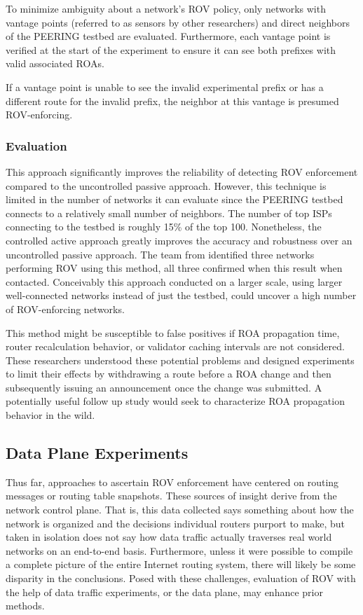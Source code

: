 \documentclass[sigconf]{acmart}
\begin{document}
To minimize ambiguity about a network's ROV policy, only networks with
vantage points (referred to as sensors by other researchers) and direct
neighbors of the PEERING testbed are evaluated.  Furthermore, each
vantage point is verified at the start of the experiment to ensure it
can see both prefixes with valid associated ROAs.

If a vantage point is unable to see the invalid experimental prefix or
has a different route for the invalid prefix, the neighbor at this
vantage is presumed ROV-enforcing.

\subsubsection{Evaluation}

This approach significantly improves the reliability of detecting ROV
enforcement compared to the uncontrolled passive approach.  However,
this technique is limited in the number of networks it can evaluate
since the PEERING testbed connects to a relatively small number of
neighbors. The number of top ISPs connecting to the testbed is roughly
15\% of the top 100.  Nonetheless, the controlled active approach
greatly improves the accuracy and robustness over an uncontrolled
passive approach.  The team from \cite{reuter_towards_2018} identified
three networks performing ROV using this method, all three confirmed
when this result when contacted.  Conceivably this approach conducted on
a larger scale, using larger well-connected networks instead of just the
testbed, could uncover a high number of ROV-enforcing networks.

This method might be susceptible to false positives if ROA propagation
time, router recalculation behavior, or validator caching intervals are
not considered.  These researchers understood these potential problems
and designed experiments to limit their effects by withdrawing a route
before a ROA change and then subsequently issuing an announcement once
the change was submitted.  A potentially useful follow up study would
seek to characterize ROA propagation behavior in the wild.

\subsection{Data Plane Experiments}

Thus far, approaches to ascertain ROV enforcement have centered on
routing messages or routing table snapshots.  These sources of insight
derive from the network control plane.  That is, this data collected
says something about how the network is organized and the decisions
individual routers purport to make, but taken in isolation does not say
how data traffic actually traverses real world networks on an end-to-end
basis.  Furthermore, unless it were possible to compile a complete
picture of the entire Internet routing system, there will likely be some
disparity in the conclusions.  Posed with these challenges, evaluation
of ROV with the help of data traffic experiments, or the data plane, may
enhance prior methods.
\end{document}
